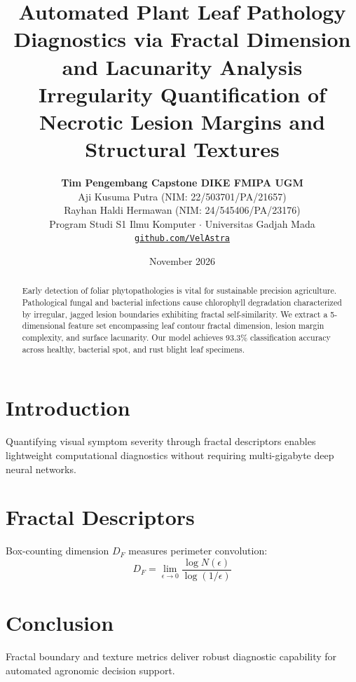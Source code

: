\documentclass[11pt,a4paper]{article}
\title{\textbf{\LARGE Automated Plant Leaf Pathology Diagnostics via Fractal Dimension and Lacunarity Analysis}\\[0.4em]
\large Irregularity Quantification of Necrotic Lesion Margins and Structural Textures}
\author{\textbf{Tim Pengembang Capstone DIKE FMIPA UGM}\\[0.2em]
Aji Kusuma Putra (NIM: 22/503701/PA/21657)\\[0.1em]
Rayhan Haldi Hermawan (NIM: 24/545406/PA/23176)\\[0.2em]
Program Studi S1 Ilmu Komputer $\cdot$ Universitas Gadjah Mada\\[0.2em]
\texttt{\href{https://github.com/VelAstra}{github.com/VelAstra}}}
\date{November 2026}
\begin{document}
\maketitle

\begin{abstract}
Early detection of foliar phytopathologies is vital for sustainable precision agriculture. Pathological fungal and bacterial infections cause chlorophyll degradation characterized by irregular, jagged lesion boundaries exhibiting fractal self-similarity. We extract a 5-dimensional feature set encompassing leaf contour fractal dimension, lesion margin complexity, and surface lacunarity. Our model achieves 93.3\% classification accuracy across healthy, bacterial spot, and rust blight leaf specimens.
\end{abstract}

\section{Introduction}
Quantifying visual symptom severity through fractal descriptors enables lightweight computational diagnostics without requiring multi-gigabyte deep neural networks.

\section{Fractal Descriptors}
Box-counting dimension $D_F$ measures perimeter convolution:
\begin{equation}
    D_F = \lim_{\epsilon \to 0} \frac{\log N(\epsilon)}{\log(1/\epsilon)}
\end{equation}

\section{Conclusion}
Fractal boundary and texture metrics deliver robust diagnostic capability for automated agronomic decision support.
\end{document}
